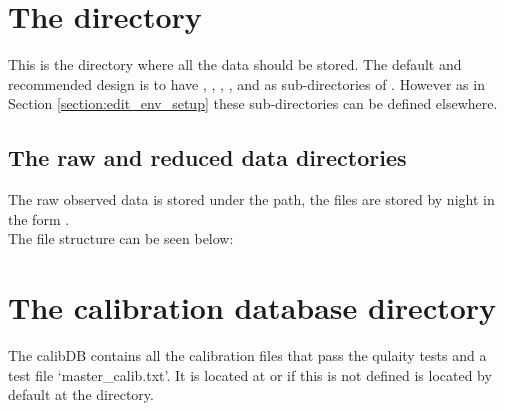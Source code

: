 \section{The  directory}
\label{section:data_root_folder}

This is the directory where all the data should be stored. The default and recommended design is to have , , , 
, and  as sub-directories of . However as in Section \ref{section:edit_env_setup} these sub-directories can be defined elsewhere.

\newpage

\subsection{The raw and reduced data directories}
\label{section:data_root_folder:raw_folder}
The raw observed data is stored under the  path, the files are stored by night in the form \constantFolderDateFormat. \\

\noindent The file structure can be seen below:

\section{The calibration database directory}
\label{section:data_root_folder:calibDB}


The calibDB contains all the calibration files that pass the qulaity tests and a test file `master\_calib.txt'. It is located at  or if this is not defined is located by default at the  directory.


